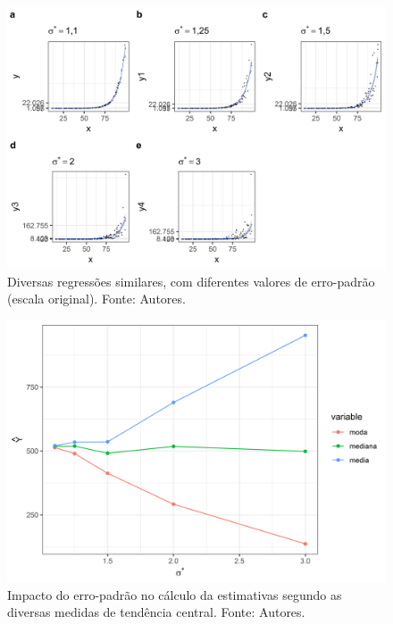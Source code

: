 \documentclass[a4paper, 12pt]{article}
\begin{document}
\begin{figure}[H]

{\centering \includegraphics[width=1\linewidth]{images/original-1} 

}

\caption{Diversas regressões similares, com diferentes valores de erro-padrão (escala original). Fonte: Autores.}\label{fig:original}
\end{figure}

\begin{figure}[H]

{\centering \includegraphics[width=0.6\linewidth]{images/estimativas-1} 

}

\caption{Impacto do erro-padrão no cálculo da estimativas segundo as diversas medidas de tendência central. Fonte: Autores.}\label{fig:estimativas}
\end{figure}
\end{document}
